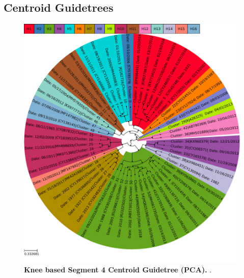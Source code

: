 \subsection{Centroid Guidetrees}

\blindtext

\begin{figure}[!hbt]
    \centering
    \includegraphics[width=\dimexpr\textwidth-2\fboxsep-2\fboxrule,fbox]{PCA/Guidetree_segment_4_H_Centroid.pdf}
    \caption[Knee based Segment 4 Centroid Guidetree (\Acrshort{PCA})]{\textbf{Knee based Segment 4 Centroid Guidetree (\Acrshort{PCA}).} .}
    \label{fig:PCA_Guidetree_Centroid_4}
\end{figure}

\blindtext

